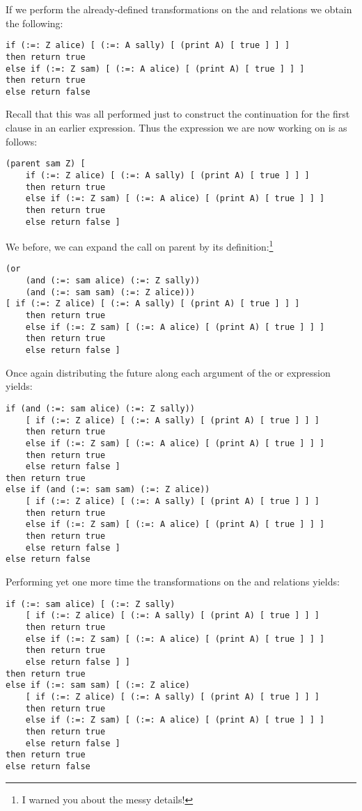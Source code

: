 If we perform the already-defined transformations on the {\sf and} relations we
obtain the following:

\begin{lstlisting}
if (:=: Z alice) [ (:=: A sally) [ (print A) [ true ] ] ]
then return true
else if (:=: Z sam) [ (:=: A alice) [ (print A) [ true ] ] ]
then return true
else return false
\end{lstlisting}

Recall that this was all performed just to construct the continuation for the
first clause in an earlier expression.  Thus the expression we are now working
on is as follows:

\begin{lstlisting}
(parent sam Z) [
    if (:=: Z alice) [ (:=: A sally) [ (print A) [ true ] ] ]
    then return true
    else if (:=: Z sam) [ (:=: A alice) [ (print A) [ true ] ] ]
    then return true
    else return false ]
\end{lstlisting}

We before, we can expand the call on {\sf parent} by its definition:\footnote{I
    warned you about the messy details!}

\begin{lstlisting}
(or
    (and (:=: sam alice) (:=: Z sally))
    (and (:=: sam sam) (:=: Z alice)))
[ if (:=: Z alice) [ (:=: A sally) [ (print A) [ true ] ] ]
    then return true
    else if (:=: Z sam) [ (:=: A alice) [ (print A) [ true ] ] ]
    then return true
    else return false ]
\end{lstlisting}

Once again distributing the future along each argument of the or expression
yields:

\begin{lstlisting}
if (and (:=: sam alice) (:=: Z sally))
    [ if (:=: Z alice) [ (:=: A sally) [ (print A) [ true ] ] ]
    then return true
    else if (:=: Z sam) [ (:=: A alice) [ (print A) [ true ] ] ]
    then return true
    else return false ]
then return true
else if (and (:=: sam sam) (:=: Z alice))
    [ if (:=: Z alice) [ (:=: A sally) [ (print A) [ true ] ] ]
    then return true
    else if (:=: Z sam) [ (:=: A alice) [ (print A) [ true ] ] ]
    then return true
    else return false ]
else return false
\end{lstlisting}

Performing yet one more time the transformations on the {\sf and} relations
yields:

\begin{lstlisting}
if (:=: sam alice) [ (:=: Z sally)
    [ if (:=: Z alice) [ (:=: A sally) [ (print A) [ true ] ] ]
    then return true
    else if (:=: Z sam) [ (:=: A alice) [ (print A) [ true ] ] ]
    then return true
    else return false ] ]
then return true
else if (:=: sam sam) [ (:=: Z alice)
    [ if (:=: Z alice) [ (:=: A sally) [ (print A) [ true ] ] ]
    then return true
    else if (:=: Z sam) [ (:=: A alice) [ (print A) [ true ] ] ]
    then return true
    else return false ]
then return true
else return false
\end{lstlisting}

